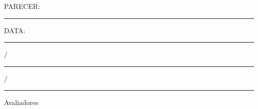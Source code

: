\begin{titlepage}

\setlength{\ABNTsignthickness}{0.3pt}
\setlength{\ABNTsignwidth}{10cm}
\setlength{\ABNTsignskip}{0.7cm}

\begin{center}
	{\tituloformat\ABNTtitulodata\par}
\end{center}

\vspace{0.3cm}

\begin{center}
	\autorformat\ABNTautordata
\end{center}

\vspace{0.3cm}

\begin{flushleft}
PARECER: \rule{7cm}{.3pt}

DATA: \rule{0.75cm}{.3pt}/\rule{0.75cm}{.3pt}/\rule{1.5cm}{.3pt}
\end{flushleft}

\begin{center}
Avaliadores
\end{center}



\end{titlepage}
